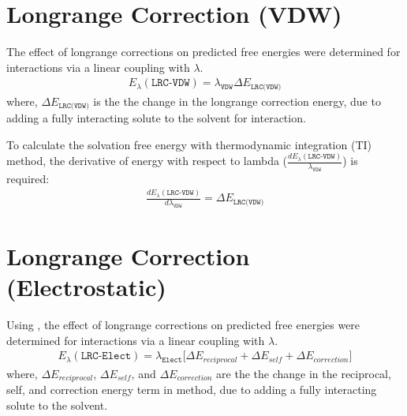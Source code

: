 \documentclass[letterpaper,10pt,english]{sphinxmanual}
\begin{document}
\section{Long\sphinxhyphen{}range Correction (VDW)}
\label{\detokenize{free_energy:long-range-correction-vdw}}
\sphinxAtStartPar
The effect of long\sphinxhyphen{}range corrections on predicted free energies were determined for  interactions via a linear coupling with \(\lambda\).
\begin{equation*}
\begin{split}E_{\lambda}(\texttt{LRC-VDW}) = \lambda_{\texttt{VDW}} \Delta E_{\texttt{LRC(VDW)}}\end{split}
\end{equation*}
\sphinxAtStartPar
where, \(\Delta E_{\texttt{LRC(VDW)}}\) is the the change in the long\sphinxhyphen{}range correction energy, due to adding a fully interacting solute
to the solvent for  interaction.

\sphinxAtStartPar
To calculate the solvation free energy with thermodynamic integration (TI) method, the derivative of energy with
respect to lambda (\(\frac{dE_{\lambda}(\texttt{LRC-VDW})}{\lambda_{\texttt{VDW}}}\)) is required:
\begin{equation*}
\begin{split}\frac{dE_{\lambda}(\texttt{LRC-VDW})}{d\lambda_{\texttt{VDW}}} = \Delta E_{\texttt{LRC(VDW)}}\end{split}
\end{equation*}

\section{Long\sphinxhyphen{}range Correction (Electrostatic)}
\label{\detokenize{free_energy:long-range-correction-electrostatic}}
\sphinxAtStartPar
Using , the effect of long\sphinxhyphen{}range corrections on predicted free energies were determined for  interactions
via a linear coupling with \(\lambda\).
\begin{equation*}
\begin{split}E_{\lambda}(\texttt{LRC-Elect}) = \lambda_{\texttt{Elect}} \bigg[\Delta E_{reciprocal} + \Delta E_{self} + \Delta E_{correction} \bigg]\end{split}
\end{equation*}
\sphinxAtStartPar
where, \(\Delta E_{reciprocal}\), \(\Delta E_{self}\), and \(\Delta E_{correction}\) are the the change in the reciprocal, self,
and correction energy term in  method, due to adding a fully interacting solute to the solvent.
\end{document}
